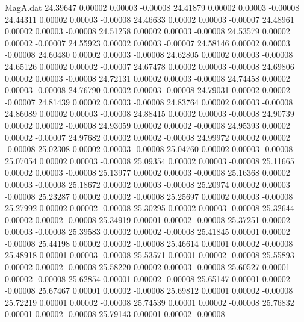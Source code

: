 \begin{filecontents}{MagA.dat}
  24.39647    0.00002    0.00003   -0.00008
  24.41879    0.00002    0.00003   -0.00008
  24.44311    0.00002    0.00003   -0.00008
  24.46633    0.00002    0.00003   -0.00007
  24.48961    0.00002    0.00003   -0.00008
  24.51258    0.00002    0.00003   -0.00008
  24.53579    0.00002    0.00002   -0.00007
  24.55923    0.00002    0.00003   -0.00007
  24.58146    0.00002    0.00003   -0.00008
  24.60480    0.00002    0.00003   -0.00008
  24.62805    0.00002    0.00003   -0.00008
  24.65126    0.00002    0.00002   -0.00007
  24.67478    0.00002    0.00003   -0.00008
  24.69806    0.00002    0.00003   -0.00008
  24.72131    0.00002    0.00003   -0.00008
  24.74458    0.00002    0.00003   -0.00008
  24.76790    0.00002    0.00003   -0.00008
  24.79031    0.00002    0.00002   -0.00007
  24.81439    0.00002    0.00003   -0.00008
  24.83764    0.00002    0.00003   -0.00008
  24.86089    0.00002    0.00003   -0.00008
  24.88415    0.00002    0.00003   -0.00008
  24.90739    0.00002    0.00002   -0.00008
  24.93059    0.00002    0.00002   -0.00008
  24.95393    0.00002    0.00002   -0.00007
  24.97682    0.00002    0.00002   -0.00008
  24.99972    0.00002    0.00002   -0.00008
  25.02308    0.00002    0.00003   -0.00008
  25.04760    0.00002    0.00003   -0.00008
  25.07054    0.00002    0.00003   -0.00008
  25.09354    0.00002    0.00003   -0.00008
  25.11665    0.00002    0.00003   -0.00008
  25.13977    0.00002    0.00003   -0.00008
  25.16368    0.00002    0.00003   -0.00008
  25.18672    0.00002    0.00003   -0.00008
  25.20974    0.00002    0.00003   -0.00008
  25.23287    0.00002    0.00002   -0.00008
  25.25697    0.00002    0.00003   -0.00008
  25.27992    0.00002    0.00002   -0.00008
  25.30295    0.00002    0.00003   -0.00008
  25.32644    0.00002    0.00002   -0.00008
  25.34919    0.00001    0.00002   -0.00008
  25.37251    0.00002    0.00003   -0.00008
  25.39583    0.00002    0.00002   -0.00008
  25.41845    0.00001    0.00002   -0.00008
  25.44198    0.00002    0.00002   -0.00008
  25.46614    0.00001    0.00002   -0.00008
  25.48918    0.00001    0.00003   -0.00008
  25.53571    0.00001    0.00002   -0.00008
  25.55893    0.00002    0.00002   -0.00008
  25.58220    0.00002    0.00003   -0.00008
  25.60527    0.00001    0.00002   -0.00008
  25.62854    0.00001    0.00002   -0.00008
  25.65147    0.00001    0.00002   -0.00008
  25.67467    0.00001    0.00002   -0.00008
  25.69812    0.00001    0.00002   -0.00008
  25.72219    0.00001    0.00002   -0.00008
  25.74539    0.00001    0.00002   -0.00008
  25.76832    0.00001    0.00002   -0.00008
  25.79143    0.00001    0.00002   -0.00008

\end{filecontents}
